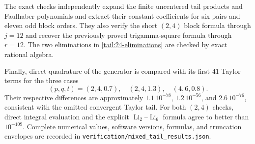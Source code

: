 The exact checks independently expand the finite uncentered tail
products and Faulhaber polynomials and extract their constant
coefficients for six pairs and eleven odd block orders. They also
verify the short \((2,4)\) block formula through \(j=12\) and
recover the previously proved trigamma-square formula through
\(r=12\). The two eliminations in
\eqref{tail:24-eliminations} are checked by exact rational algebra.

Finally, direct quadrature of the generator is compared with its
first \(41\) Taylor terms for the three cases
\[
 (p,q,t)=(2,4,0.7),\quad (2,4,1.3),\quad (4,6,0.8).
\]
Their respective differences are approximately
\(1.1\,10^{-78}\), \(1.2\,10^{-56}\), and
\(2.6\,10^{-76}\), consistent with the omitted convergent Taylor
tail. For both \((2,4)\) checks, direct integral evaluation and
the explicit \(\operatorname{Li}_2\)--\(\operatorname{Li}_6\)
formula agree to better than \(10^{-109}\). Complete numerical
values, software versions, formulas, and truncation envelopes are
recorded in \texttt{verification/mixed\_tail\_results.json}.

